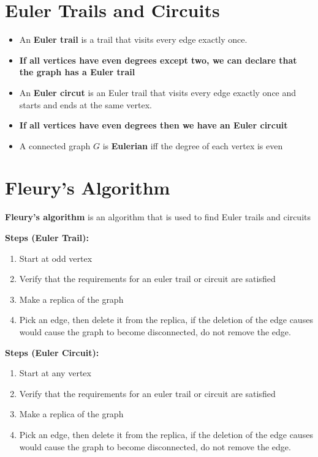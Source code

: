 \documentclass{report}
\begin{document}
    \section{\LARGE Euler Trails and Circuits}
    \bigbreak \noindent 
    \smallbreak \noindent
    \begin{definition}
        \begin{itemize}
            \item  An \textbf{Euler trail} is a trail that visits every edge exactly once.
            \item \textbf{If all vertices have even degrees except two, we can declare that the graph has a Euler trail}
            \item An \textbf{Euler circut} is an Euler trail that visits every edge exactly once and starts and ends at the same vertex.
            \item \textbf{If all vertices have even degrees then we have an Euler circuit}
            \item A connected graph $G$ is \textbf{Eulerian} iff the degree of each vertex is even
        \end{itemize}
    \end{definition}

    \pagebreak \bigbreak \noindent 
    \section{\LARGE Fleury's Algorithm}
    \bigbreak \noindent 
    \smallbreak \noindent
    \begin{definition}
        \textbf{Fleury's algorithm} is an algorithm that is used to find Euler trails and circuits 
    \end{definition}
    \bigbreak \noindent 
    \textbf{Steps (Euler Trail):}
    \begin{enumerate}
        \item Start at odd vertex
        \item Verify that the requirements for an euler trail or circuit are satisfied
        \item Make a replica of the graph
        \item Pick an edge, then delete it from the replica, if the deletion of the edge causes would cause the graph to become disconnected, do not remove the edge.
    \end{enumerate}
    \bigbreak \noindent 
    \textbf{Steps (Euler Circuit):}
    \begin{enumerate}
        \item Start at any vertex
        \item Verify that the requirements for an euler trail or circuit are satisfied
        \item Make a replica of the graph
        \item Pick an edge, then delete it from the replica, if the deletion of the edge causes would cause the graph to become disconnected, do not remove the edge.
    \end{enumerate}
\end{document}
